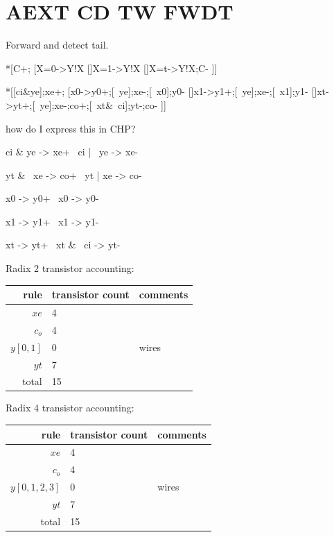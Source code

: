 \documentclass{article}
\begin{document}
\section{AEXT CD TW FWDT \label{sec:AEXT_CD_TW_FWDT}}

Forward and detect tail.

\begin{csp}
*[C+;
  [X=0->Y!X
  []X=1->Y!X
  []X=t->Y!X;C-
 ]]
\end{csp}

\begin{hse}
*[[ci&ye];xe+;
  [x0->y0+;[~ye];xe-;[~x0];y0-
  []x1->y1+;[~ye];xe-;[~x1];y1-
  []xt->yt+;[~ye];xe-;co+;[~xt&~ci];yt-;co-
 ]]
\end{hse}

how do I express this in CHP?

\begin{prs2}
ci & ye -> xe+
~ci | ~ye -> xe-

yt & ~xe -> co+
~yt | xe -> co-
\end{prs2}

\begin{prs2}
x0 -> y0+
~x0 -> y0-

x1 -> y1+
~x1 -> y1-

xt -> yt+
~xt & ~ci -> yt-
\end{prs2}

\noindent
Radix 2 transistor accounting:

\begin{center}
    \begin{tabular}{|r|l|l|}
    \hline
    rule & transistor count & comments \\ \hline
    $xe$ & 4 & \\ \hline
    $c_o$ & 4 & \\ \hline
    $y[0,1]$ & 0 & wires \\ \hline
    $yt$ & 7 & \\ \hline
    \hline total & 15 & \\ \hline
    \end{tabular}
\end{center}

\noindent
Radix 4 transistor accounting:

\begin{center}
    \begin{tabular}{|r|l|l|}
    \hline
    rule & transistor count & comments \\ \hline
    $xe$ & 4 & \\ \hline
    $c_o$ & 4 & \\ \hline
    $y[0,1,2,3]$ & 0 & wires \\ \hline
    $yt$ & 7 & \\ \hline
    \hline total & 15 & \\ \hline
    \end{tabular}
\end{center}
\end{document}
